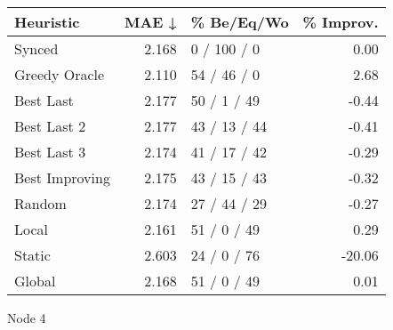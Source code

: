 \begin{tabular}{lrlr}
\toprule
\textbf{Heuristic} & \textbf{MAE ↓} & \textbf{\% Be/Eq/Wo} & \textbf{\% Improv.} \\
\midrule
            Synced &          2.168 &          0 / 100 / 0 &                0.00 \\
     Greedy Oracle &          2.110 &          54 / 46 / 0 &                2.68 \\
         Best Last &          2.177 &          50 / 1 / 49 &               -0.44 \\
       Best Last 2 &          2.177 &         43 / 13 / 44 &               -0.41 \\
       Best Last 3 &          2.174 &         41 / 17 / 42 &               -0.29 \\
    Best Improving &          2.175 &         43 / 15 / 43 &               -0.32 \\
            Random &          2.174 &         27 / 44 / 29 &               -0.27 \\
             Local &          2.161 &          51 / 0 / 49 &                0.29 \\
            Static &          2.603 &          24 / 0 / 76 &              -20.06 \\
            Global &          2.168 &          51 / 0 / 49 &                0.01 \\
\bottomrule
\end{tabular}
\caption{Node 4}
\label{tab:hr_iid_lr01_le2_bs2_4}
